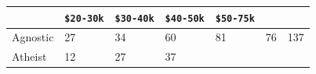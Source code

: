 \documentclass[12pt,oneside]{reedthesis}
\theoremstyle{definition}
\theoremstyle{definition}
\theoremstyle{definition}
\theoremstyle{remark}
\begin{document}
\begin{longtable}[]{@{}lllllll@{}}
\begin{minipage}[b]{0.11\columnwidth}
\end{minipage} & \begin{minipage}[b]{0.11\columnwidth}\raggedright\strut
\texttt{\$20-30k}\strut
\end{minipage} & \begin{minipage}[b]{0.11\columnwidth}\raggedright\strut
\texttt{\$30-40k}\strut
\end{minipage} & \begin{minipage}[b]{0.11\columnwidth}\raggedright\strut
\texttt{\$40-50k}\strut
\end{minipage} & \begin{minipage}[b]{0.11\columnwidth}\raggedright\strut
\texttt{\$50-75k}\strut
\end{minipage}\tabularnewline
\midrule
\endhead
\begin{minipage}[t]{0.16\columnwidth}\raggedright\strut
Agnostic\strut
\end{minipage} & \begin{minipage}[t]{0.09\columnwidth}\raggedright\strut
27\strut
\end{minipage} & \begin{minipage}[t]{0.11\columnwidth}\raggedright\strut
34\strut
\end{minipage} & \begin{minipage}[t]{0.11\columnwidth}\raggedright\strut
60\strut
\end{minipage} & \begin{minipage}[t]{0.11\columnwidth}\raggedright\strut
81\strut
\end{minipage} & \begin{minipage}[t]{0.11\columnwidth}\raggedright\strut
76\strut
\end{minipage} & \begin{minipage}[t]{0.11\columnwidth}\raggedright\strut
137\strut
\end{minipage}\tabularnewline
\begin{minipage}[t]{0.16\columnwidth}\raggedright\strut
Atheist\strut
\end{minipage} & \begin{minipage}[t]{0.09\columnwidth}\raggedright\strut
12\strut
\end{minipage} & \begin{minipage}[t]{0.11\columnwidth}\raggedright\strut
27\strut
\end{minipage} & \begin{minipage}[t]{0.11\columnwidth}\raggedright\strut
37\strut
\end{minipage} & \begin{minipage}[t]{0.11\columnwidth}\raggedright\strut

\end{minipage}
\end{longtable}
\end{document}
